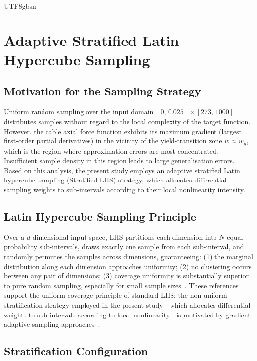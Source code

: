 \documentclass[a4paper,12pt]{report}
\begin{document}
\begin{CJK}{UTF8}{gbsn}
\section{Adaptive Stratified Latin Hypercube Sampling}
\label{sec:sampling}

\subsection{Motivation for the Sampling Strategy}
\label{subsec:sampling_motivation}

Uniform random sampling over the input domain $[0,\,0.025] \times [273,\,1000]$ distributes
samples without regard to the local complexity of the target function. However, the cable
axial force function exhibits its maximum gradient (largest first-order partial derivatives)
in the vicinity of the yield-transition zone $w \approx w_y$, which is the region where
approximation errors are most concentrated. Insufficient sample density in this region
leads to large generalisation errors. Based on this analysis, the present study employs an
adaptive stratified Latin hypercube sampling (Stratified LHS) strategy, which allocates
differential sampling weights to sub-intervals according to their local nonlinearity
intensity.

\subsection{Latin Hypercube Sampling Principle}
\label{subsec:lhs_principle}

Over a $d$-dimensional input space, LHS partitions each dimension into $N$ equal-
probability sub-intervals, draws exactly one sample from each sub-interval, and randomly
permutes the samples across dimensions, guaranteeing: (1) the marginal distribution along
each dimension approaches uniformity; (2) no clustering occurs between any pair of
dimensions; (3) coverage uniformity is substantially superior to pure random sampling,
especially for small sample sizes~\cite{mckay1979lhs,stein1987lhs}. These references
support the uniform-coverage principle of standard LHS; the non-uniform stratification
strategy employed in the present study---which allocates differential weights to
sub-intervals according to local nonlinearity---is motivated by gradient-adaptive sampling
approaches~\cite{fuhg2021local}.

\subsection{Stratification Configuration}
\label{subsec:lhs_config}


\end{CJK}
\end{document}
